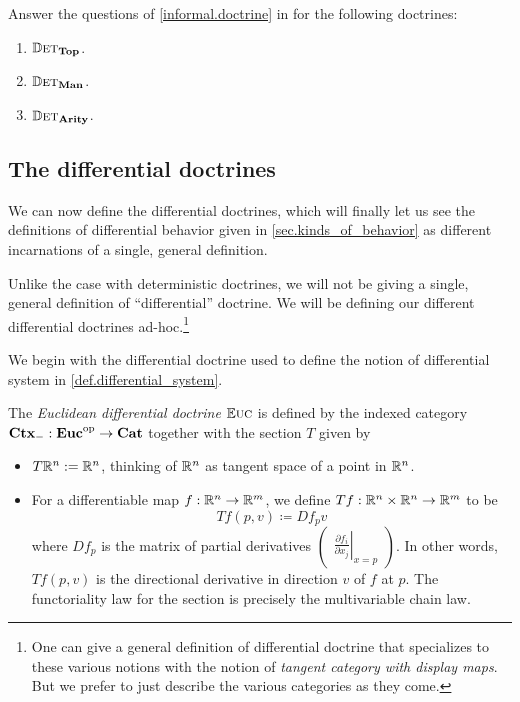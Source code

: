 \documentclass[DynamicalBook]{subfiles}
\begin{document}
\begin{exercise}
Answer the questions of \cref{informal.doctrine} in for the following doctrines:
\begin{enumerate}
   \item $\mathbb{D}\textsc{et}_{\textbf{Top}}$.
   \item $\mathbb{D}\textsc{et}_{\textbf{Man}}$.
   \item $\mathbb{D}\textsc{et}_{\textbf{Arity}}$.
\end{enumerate}
\end{exercise}

\subsection{The differential doctrines}

We can now define the differential doctrines, which will finally let us see the
definitions of differential behavior given in \cref{sec.kinds_of_behavior} as
different incarnations of a single, general definition.

Unlike the case with deterministic doctrines, we will not be giving a single,
general definition of ``differential'' doctrine. We will be defining our
different differential doctrines ad-hoc.\footnote{One can give a general
  definition of differential doctrine that specializes to these various notions
  with the notion of \emph{tangent category with display maps}. But we prefer to
just describe the various categories as they come.}

We begin with the differential doctrine used to define the notion of
differential system in \cref{def.differential_system}. 
\begin{definition}
The \emph{Euclidean differential doctrine} $\mathbb{E}\textsc{uc}$ is defined by the indexed
category $\textbf{Ctx}_{-} : \textbf{Euc}^{\textnormal{op}} \to \textbf{Cat}$ together with the section $T$
given by 
\begin{itemize}
  \item $T\mathbb{R}^n := \mathbb{R}^n$, thinking of $\mathbb{R}^n$ as tangent space of a point in $\mathbb{R}^n$.
  \item For a differentiable map $ f : \mathbb{R}^n \to \mathbb{R}^m$, we define $Tf : \mathbb{R}^n
    \times \mathbb{R}^n \to \mathbb{R}^m$ to be 
\[
Tf(p, v) \coloneqq Df_p v
\]
where $Df_p$ is the matrix of partial derivatives \(\begin{pmatrix}
\left.\frac{\partial f_i}{\partial x_j}\right|_{x = p}
\end{pmatrix}\). 
In other words, $Tf(p, v)$ is the directional derivative in direction $v$ of $f$
at $p$. The functoriality law for the section is precisely the multivariable
chain law.
\end{itemize}
\end{definition}
\end{document}
